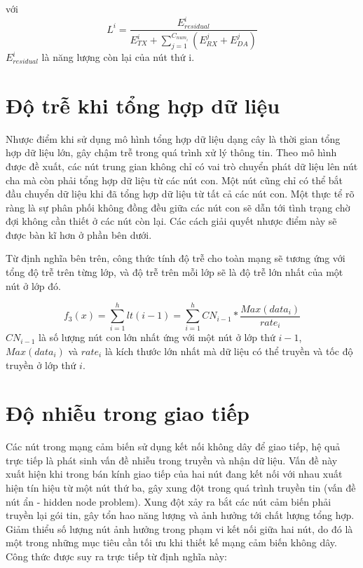 với
\begin{equation}
L^i = \frac{E^i_{residual}}{E^i_{TX} + \sum_{j=1}^{C_{num_i}} (E_{RX}^j + E_{DA}^j)}
\end{equation}
$E^i_{residual}$ là năng lượng còn lại của nút thứ i.

\section{Độ trễ khi tổng hợp dữ liệu}
Nhược điểm khi sử dụng mô hình tổng hợp dữ liệu dạng cây là thời gian tổng hợp dữ liệu lớn, gây chậm trễ trong quá trình xử lý thông tin. Theo mô hình được đề xuất, các nút trung gian không chỉ có vai trò chuyển phát dữ liệu lên nút cha mà còn phải tổng hợp dữ liệu từ các nút con. Một nút cũng chỉ có thể bắt đầu chuyển dữ liệu khi đã tổng hợp dữ liệu từ tất cả các nút con. Một thực tể rõ ràng là sự phân phối không đồng đều giữa các nút con sẽ dẫn tới tình trạng chờ đợi không cần thiết ở các nút còn lại. Các cách giải quyết nhược điểm này sẽ được bàn kĩ hơn ở phần bên dưới.

Từ định nghĩa bên trên, công thức tính độ trễ cho toàn mạng sẽ tương ứng với tổng độ trễ trên từng lớp, và độ trễ trên mỗi lớp sẽ là độ trễ lớn nhất của một nút ở lớp đó.

\begin{equation}
f_3(x) = \sum_{i=1}^h lt(i-1) = \sum_{i=1}^h CN_{i-1} * \frac{Max(data_i)}{rate_i}
\end{equation}
$CN_{i-1}$ là số lượng nút con lớn nhất ứng với một nút ở lớp thứ $i-1$,  $Max(data_i)$ và $rate_i$ là kích thước lớn nhất mà dữ liệu có thể truyền và tốc độ truyền ở lớp thứ $i$.

\section{Độ nhiễu trong giao tiếp}
Các nút trong mạng cảm biến sử dụng kết nối không dây để giao tiếp, hệ quả trực tiếp là phát sinh vấn đề nhiễu trong truyền và nhận dữ liệu. Vấn đề này xuất hiện khi trong bán kính giao tiếp của hai nút đang kết nối với nhau xuất hiện tín hiệu từ một nút thứ ba, gây xung đột trong quá trình truyền tin (vấn đề nút ẩn - hidden node problem). Xung đột xảy ra bắt các nút cảm biến phải truyền lại gói tin, gây tổn hao năng lượng và ảnh hưởng tới chất lượng tổng hợp. Giảm thiểu số lượng nút ảnh hưởng trong phạm vi kết nối giữa hai nút, do đó là một trong những mục tiêu cần tối ưu khi thiết kế mạng cảm biến không dây. Công thức được suy ra trực tiếp từ định nghĩa này:

